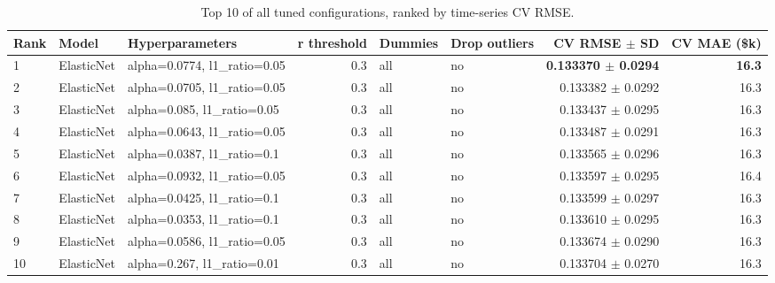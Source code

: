 \begin{table}[t]
\centering
\small
\begin{tabular}{lllrllrr}
\toprule
Rank & Model & Hyperparameters & r threshold & Dummies & Drop outliers & CV RMSE $\pm$ SD & CV MAE (\$k) \\
\midrule
1 & ElasticNet & alpha=0.0774, l1\_ratio=0.05 & 0.3 & all & no & \textbf{0.133370 $\pm$ 0.0294} & \textbf{16.3} \\
2 & ElasticNet & alpha=0.0705, l1\_ratio=0.05 & 0.3 & all & no & 0.133382 $\pm$ 0.0292 & 16.3 \\
3 & ElasticNet & alpha=0.085, l1\_ratio=0.05 & 0.3 & all & no & 0.133437 $\pm$ 0.0295 & 16.3 \\
4 & ElasticNet & alpha=0.0643, l1\_ratio=0.05 & 0.3 & all & no & 0.133487 $\pm$ 0.0291 & 16.3 \\
5 & ElasticNet & alpha=0.0387, l1\_ratio=0.1 & 0.3 & all & no & 0.133565 $\pm$ 0.0296 & 16.3 \\
6 & ElasticNet & alpha=0.0932, l1\_ratio=0.05 & 0.3 & all & no & 0.133597 $\pm$ 0.0295 & 16.4 \\
7 & ElasticNet & alpha=0.0425, l1\_ratio=0.1 & 0.3 & all & no & 0.133599 $\pm$ 0.0297 & 16.3 \\
8 & ElasticNet & alpha=0.0353, l1\_ratio=0.1 & 0.3 & all & no & 0.133610 $\pm$ 0.0295 & 16.3 \\
9 & ElasticNet & alpha=0.0586, l1\_ratio=0.05 & 0.3 & all & no & 0.133674 $\pm$ 0.0290 & 16.3 \\
10 & ElasticNet & alpha=0.267, l1\_ratio=0.01 & 0.3 & all & no & 0.133704 $\pm$ 0.0270 & 16.3 \\
\bottomrule
\end{tabular}
\caption{Top 10 of all tuned configurations, ranked by time-series CV RMSE.}
\label{tab:top10}
\end{table}
